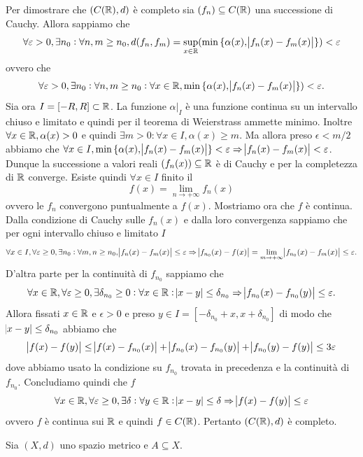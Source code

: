 \documentclass[a4paper]{article}\par \usepackage{style}\par
\begin{document}
Per dimostrare che $ (C(\mathbb{R}), d) $ è completo sia $ (f_n) \subseteq C(\mathbb{R}) $ una successione di Cauchy. Allora sappiamo che \[\forall \varepsilon > 0, \exists n_0 : \forall n, m \geq n_0, d(f_n, f_m) =  \sup_{x \in \mathbb{R}}(\min{\{\alpha(x), \abs{f_n(x) - f_m(x)}\}}) < \varepsilon\] ovvero che \[\forall \varepsilon > 0, \exists n_0 : \forall n, m \geq n_0 : \forall x \in \mathbb{R}, \min{\{\alpha(x), \abs{f_n(x) - f_m(x)}\}}) < \varepsilon.\] Sia ora $ I = [-R, R] \subset \mathbb{R} $. La funzione $ \alpha |_{I} $ è una funzione continua su un intervallo chiuso e limitato e quindi per il teorema di Weierstrass ammette minimo. Inoltre $ \forall x \in \mathbb{R}, \alpha(x) > 0 $ e quindi $ \exists m > 0 : \forall x \in I, \alpha(x) \geq m $. Ma allora preso $ \epsilon < m/2 $ abbiamo che $ \forall x \in I, \min{\{\alpha(x), \abs{f_n(x) - f_m(x)}\}} < \varepsilon \Rightarrow  \abs{f_n(x) - f_m(x)} < \varepsilon $. Dunque la successione a valori reali $ (f_n(x)) \subseteq \mathbb{R} $ è di Cauchy e per la completezza di $ \mathbb{R} $ converge. Esiste quindi $ \forall x \in I $ finito il \[f(x) = \lim_{n \to +\infty} f_n(x)\] ovvero le $ f_n $ convergono puntualmente a $ f(x) $. Mostriamo ora che $ f $ è continua. Dalla condizione di Cauchy sulle $ f_n(x) $ e dalla loro convergenza sappiamo che per ogni intervallo chiuso e limitato $ I $ \[\forall x \in I, \forall \varepsilon \geq 0, \exists n_0 : \forall m, n \geq n_0, \abs{f_n(x) - f_m(x)} \leq \varepsilon \Rightarrow \abs{f_{n_0}(x) - f(x)} = \lim_{m \to +\infty} \abs{f_{n_0}(x) - f_m(x)} \leq \varepsilon.\] D'altra parte per la continuità di $ f_{n_0} $ sappiamo che \[\forall x \in \mathbb{R}, \forall \varepsilon \geq 0, \exists \delta_{n_0} \geq 0 : \forall x \in \mathbb{R} : \abs{x - y} \leq \delta_{n_0} \Rightarrow \abs{f_{n_0}(x) - f_{n_0}(y)} \leq \varepsilon.\] Allora fissati $ x \in \mathbb{R} $ e $ \epsilon > 0 $ e preso $ y \in I = [- \delta_{n_0} + x, x + \delta_{n_0}] $ di modo che $ \abs{x - y} \leq \delta_{n_0} $ abbiamo che \[\abs{f(x) - f(y)} \leq \abs{f(x) - f_{n_0}(x)} + \abs{f_{n_0}(x) - f_{n_0}(y)} + \abs{f_{n_0}(y) - f(y)} \leq 3\varepsilon\] dove abbiamo usato la condizione su $ f_{n_0} $ trovata in precedenza e la continuità di $ f_{n_0} $. Concludiamo quindi che $ f $ \[\forall x \in \mathbb{R}, \forall \varepsilon \geq 0, \exists \delta : \forall y \in \mathbb{R} : \abs{x - y} \leq \delta \Rightarrow \abs{f(x) - f(y)} \leq \varepsilon\] ovvero $ f $ è continua sui $ \mathbb{R} $ e quindi $ f \in C(\mathbb{R}) $. Pertanto $ (C(\mathbb{R}), d) $ è completo.\par \begin{es}
  Sia $ (X, d) $ uno spazio metrico e $ A \subseteq X $.
  \begin{enumerate}[label = (\roman*)]

\end{enumerate}
\end{es}
\end{document}
